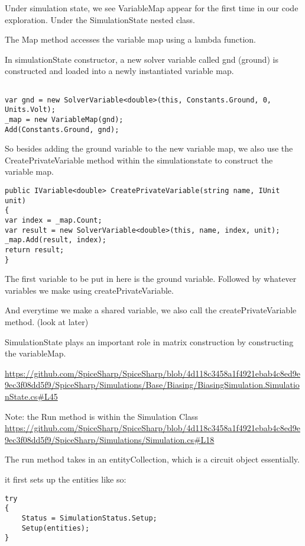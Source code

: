 \documentclass[12pt]{article}
\renewcommand{\_}{\kern-1.5pt\textunderscore\kern-1.5pt}
\begin{document}
Under simulation state, we see VariableMap appear for the first time in our code exploration. Under the SimulationState nested class. 

The Map method accesses the variable map using a lambda function. 

In simulationState constructor, a new solver variable called gnd (ground) is constructed and loaded into a newly instantiated variable map.

\begin{verbatim}

var gnd = new SolverVariable<double>(this, Constants.Ground, 0, Units.Volt);
_map = new VariableMap(gnd);
Add(Constants.Ground, gnd);
\end{verbatim}

So besides adding the ground variable to the new variable map,
we also use the CreatePrivateVariable method within the simulationstate to construct the variable map. 

\begin{verbatim}
public IVariable<double> CreatePrivateVariable(string name, IUnit unit)
{
var index = _map.Count;
var result = new SolverVariable<double>(this, name, index, unit);
_map.Add(result, index);
return result;
}
\end{verbatim}

The first variable to be put in here is the ground variable. Followed by whatever variables we make using createPrivateVariable. 

And everytime we make a shared variable, we also call the createPrivateVariable method. (look at later)

SimulationState plays an important role in matrix construction by constructing the variableMap. 

\url{https://github.com/SpiceSharp/SpiceSharp/blob/4d118c3458a1f4921ebab4c8ed9e9ec3f08dd5f9/SpiceSharp/Simulations/Base/Biasing/BiasingSimulation.SimulationState.cs#L45}


Note: the Run method is within the Simulation Class
\url{https://github.com/SpiceSharp/SpiceSharp/blob/4d118c3458a1f4921ebab4c8ed9e9ec3f08dd5f9/SpiceSharp/Simulations/Simulation.cs#L18}

The run method takes in an entityCollection, which is a circuit object essentially.

it first sets up the entities like so:
\begin{verbatim}
try
{
	Status = SimulationStatus.Setup;
	Setup(entities);
}
\end{verbatim}
\end{document}
